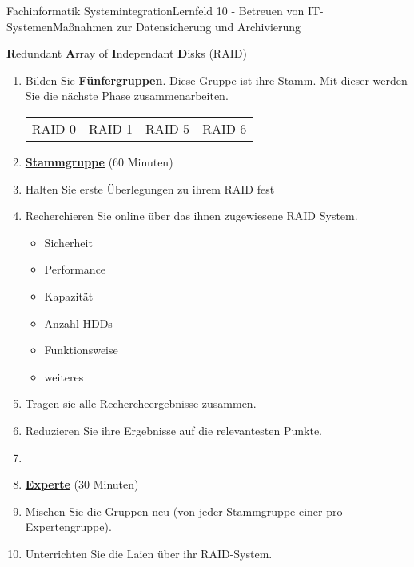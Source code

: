 \documentclass[oneside,openany,headings=optiontotoc,11pt,numbers=noenddot,Nassi]{scrreprt}
\begin{document}
	\begin{worksheet}{Fachinformatik Systemintegration}{Lernfeld 10 - Betreuen von IT-Systemen}{Maßnahmen zur Datensicherung und Archivierung}
		\begin{framed}
			\noindent
			\begin{center}
				\Large
				\textbf{R}edundant \textbf{A}rray of \textbf{I}ndependant \textbf{D}isks \footnotesize (RAID)
			\end{center}
			\normalsize
			\begin{enumerate}
				\item[] Bilden Sie \textbf{Fünfergruppen}. Diese Gruppe ist ihre \underline{Stamm}. Mit dieser werden Sie die nächste Phase zusammenarbeiten.\\
				\begin{tabularx}{0.98\textwidth}{M|M|M|M}
					RAID 0 & RAID 1 & RAID 5 & RAID 6
				\end{tabularx}
				\item[] \textbf{\underline{Stammgruppe}} (60 Minuten)
				\item Halten Sie erste Überlegungen zu ihrem RAID fest
				\item Recherchieren Sie online über das ihnen zugewiesene RAID System.
				\begin{itemize}
					\item Sicherheit
					\item Performance
					\item Kapazität
					\item Anzahl HDD\grq{}s
					\item Funktionsweise
					\item weiteres
				\end{itemize}
				\item Tragen sie alle Rechercheergebnisse zusammen.
				\item Reduzieren Sie ihre Ergebnisse auf die relevantesten Punkte.
				\item[] 
				\item[] \textbf{\underline{Experte}} (30 Minuten)
				\item Mischen Sie die Gruppen neu (von jeder Stammgruppe einer pro Expertengruppe).
				\item Unterrichten Sie die \grq{}Laien\grq{} über ihr RAID-System.
			\end{enumerate}
		\end{framed}
	\end{worksheet}
\end{document}
